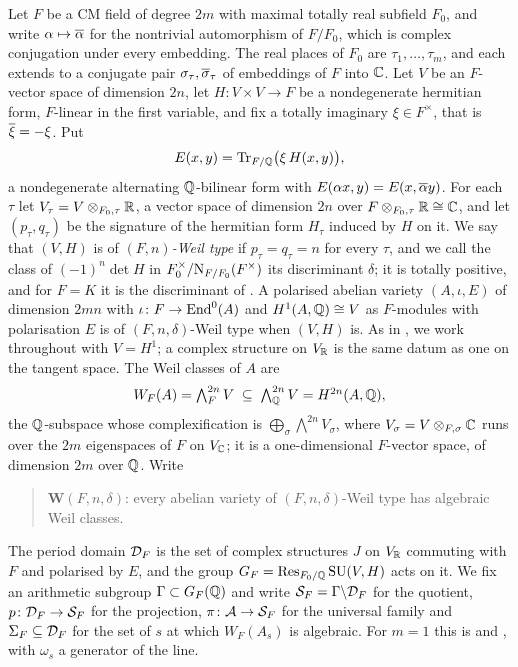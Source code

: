 \begin{setupenv}\label{setup:cmfield}
Let $F$ be a CM field of degree $2m$ with maximal totally real subfield
$F_{0}$, and write $\alpha\mapsto\overline{\alpha}$ for the nontrivial automorphism
of $F/F_{0}$, which is complex conjugation under every embedding. The real
places of $F_{0}$ are $\tau_{1},\dots,\tau_{m}$, and each extends to a
conjugate pair $\sigma_{\tau},\overline{\sigma}_{\tau}$ of embeddings of $F$ into
$\mathbb{C}$. Let $V$ be an $F$-vector space of dimension $2n$, let
$H\colon V\times V\to F$ be a nondegenerate hermitian form, $F$-linear in the
first variable, and fix a totally imaginary $\xi\in F^{\times}$, that is
$\overline{\xi}=-\xi$. Put
\[
  E(x,y)=\operatorname{Tr}_{F/\mathbb{Q}}\bigl(\xi\,H(x,y)\bigr),
\]
a nondegenerate alternating $\mathbb{Q}$-bilinear form with
$E(\alpha x,y)=E(x,\overline{\alpha} y)$. For each $\tau$ let
$V_{\tau}=V\otimes_{F_{0},\tau}\mathbb{R}$, a vector space of dimension $2n$ over
$F\otimes_{F_{0},\tau}\mathbb{R}\cong\mathbb{C}$, and let $(p_{\tau},q_{\tau})$ be the
signature of the hermitian form $H_{\tau}$ induced by $H$ on it. We say that
$(V,H)$ is of \emph{$(F,n)$-Weil type} if $p_{\tau}=q_{\tau}=n$ for every
$\tau$, and we call the class of $(-1)^{n}\det H$ in
$F_{0}^{\times}/\mathrm{N}_{F/F_{0}}(F^{\times})$ its discriminant $\delta$; it is
totally positive, and for $F=K$ it is the discriminant of . A
polarised abelian variety $(A,\iota,E)$ of dimension $2mn$ with
$\iota\colon F\to\operatorname{End}^{0}(A)$ and $H^{1}(A,\mathbb{Q})\cong V$ as $F$-modules with
polarisation $E$ is of $(F,n,\delta)$-Weil type when $(V,H)$ is. As in
, we work throughout with $V=H^{1}$; a complex structure on
$V_{\mathbb{R}}$ is the same datum as one on the tangent space. The Weil
classes of $A$ are
\[
  W_{F}(A)=\textstyle\bigwedge^{2n}_{F}V\;\subseteq\;\bigwedge^{2n}_{\mathbb{Q}}V
  =H^{2n}(A,\mathbb{Q}),
\]
the $\mathbb{Q}$-subspace whose complexification is
$\bigoplus_{\sigma}\bigwedge^{2n}V_{\sigma}$, where $V_{\sigma}=V\otimes_{F,\sigma}\mathbb{C}$
runs over the $2m$ eigenspaces of $F$ on $V_{\mathbb{C}}$; it is a one-dimensional
$F$-vector space, of dimension $2m$ over $\mathbb{Q}$. Write
\begin{quote}
$\mathbf{W}(F,n,\delta)$: every abelian variety of $(F,n,\delta)$-Weil type
has algebraic Weil classes.
\end{quote}
The period domain $\mathcal{D}_{F}$ is the set of complex structures $J$ on
$V_{\mathbb{R}}$ commuting with $F$ and polarised by $E$, and the group
$G_{F}=\operatorname{Res}_{F_{0}/\mathbb{Q}}\operatorname{SU}(V,H)$ acts on it. We fix an arithmetic subgroup
$\Gamma\subset G_{F}(\mathbb{Q})$ and write $\mathcal{S}_{F}=\Gamma\backslash\mathcal{D}_{F}$ for the
quotient, $p\colon\mathcal{D}_{F}\to\mathcal{S}_{F}$ for the projection,
$\pi\colon\mathcal{A}\to\mathcal{S}_{F}$ for the universal family and
$\Sigma_{F}\subseteq\mathcal{D}_{F}$ for the set of $s$ at which $W_{F}(A_{s})$ is
algebraic. For $m=1$ this is  and ,
with $\omega_{s}$ a generator of the line.
\end{setupenv}

